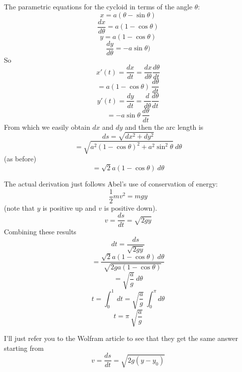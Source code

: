 \documentclass[11pt, oneside]{article}
\begin{document}
The parametric equations for the cycloid in terms of the angle $\theta$:
\[ x = a (\theta - \sin \theta) \]
\[ \frac{dx}{d \theta} = a(1 - \cos \theta) \]
\[ y = a (1 - \cos \theta) \]
\[ \frac{dy}{d \theta} = - a \sin \theta) \]
So
\[ x'(t) = \frac{dx}{dt} = \frac{dx}{d \theta} \frac{d \theta}{dt} \]
\[ = a(1 - \cos \theta) \ \frac{d \theta}{dt} \]
\[ y'(t) = \frac{dy}{dt} = \frac{d}{d \theta} \frac{d \theta}{dt}  \]
\[ = -a \sin \theta \ \frac{d \theta}{dt} \]
From which we easily obtain $dx$ and $dy$ and then the arc length is
\[ ds = \sqrt{dx^2 + dy^2} \]
\[ =  \sqrt{a^2(1 - \cos \theta)^2 + a^2 \sin^2 \theta}  \ d \theta \]
(as before)
\[ = \sqrt{2} a (1 - \cos \theta) \ d \theta \]

The actual derivation just follows Abel's use of conservation of energy:
\[ \frac{1}{2} mv^2 = mgy \]
(note that $y$ is positive up and $v$ is positive down).
\[ v = \frac{ds}{dt} = \sqrt{2gy} \]
Combining these results
\[ dt = \frac{ds}{\sqrt{2gy}}  \]
\[ = \frac{ \sqrt{2} a (1 - \cos \theta) \ d \theta}{\sqrt{2g a (1 - \cos \theta)}} \]
\[ = \sqrt{\frac{a}{g}} \ d \theta \]
\[ t = \int_0^1 \ dt = \sqrt{\frac{a}{g}} \  \int_0^{\pi} d \theta \]
\[ t = \pi \  \sqrt{\frac{a}{g}} \]

I'll just refer you to the Wolfram article to see that they get the same answer starting from
\[ v = \frac{ds}{dt} = \sqrt{2g(y - y_0)}  \]
\end{document}
